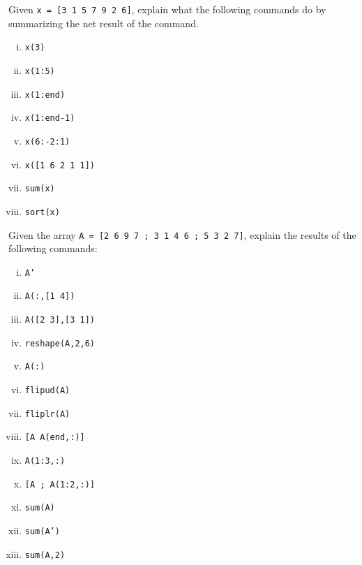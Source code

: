 \documentclass{beamer}
\begin{document}
\begin{frame}
	\large
Given \texttt{x = [3 1 5 7 9 2 6]}, explain what the following commands do by
summarizing the net result of the command.

\begin{multicols}{2}
\begin{enumerate}[(i)]
	\item  \texttt{x(3)}
	\item \texttt{x(1:5)}
	\item \texttt{x(1:end)}
	\item \texttt{x(1:end-1)}
	\item \texttt{x}\texttt{(6:-2:1)}
	\item \texttt{x([1 6 2 1 1])}
	\item \texttt{sum(x)}
	\item \texttt{sort(x)}
\end{enumerate}	
\end{multicols}
\end{frame}

\begin{frame}
	Given the array \texttt{A = [2 6 9 7 ; 3 1 4 6 ; 5 3 2 7]}, explain the results of the
	following commands:

\begin{multicols}{2}
	\begin{enumerate}[(i)]	
\item \texttt{A'}
\item \texttt{A(:,[1 4])}
\item \texttt{A([2 3],[3 1])}
\item \texttt{reshape(A,2,6)}
\item \texttt{A(:)}
\item \texttt{flipud(A)}
\item \texttt{fliplr(A)}
\item \texttt{[A A(end,:)]}
\item \texttt{A(1:3,:)}
\item \texttt{[A ; A(1:2,:)]}
\item \texttt{sum(A)}
\item \texttt{sum(A')}
\item \texttt{sum(A,2)}
\end{enumerate}	
\end{multicols}
\end{frame}
\end{document}
